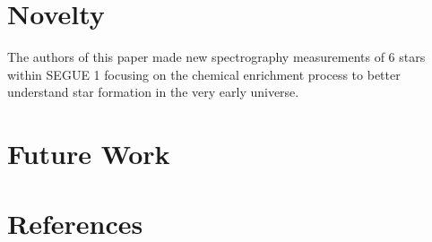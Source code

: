 \section{Novelty}

The authors of this paper made new spectrography measurements of 6 stars within SEGUE 1 focusing on the chemical enrichment process
to better understand star formation in the very early universe. 

\section{Future Work}

\clearpage

\section{References}



